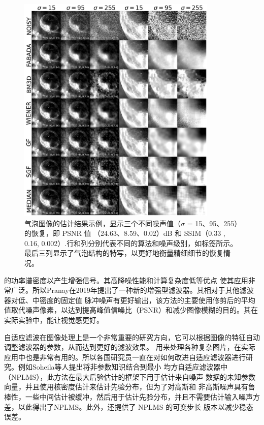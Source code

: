 \begin{figure}[htbp]
	\begin{center}
		\includegraphics[width = 0.85\textwidth]{images/02.eps}
		\caption{气泡图像的估计结果示例，显示三个不同噪声值（$\sigma$ = 15、95、255）的恢复，即 PSNR 值
        （24.63、8.59、0.02）dB 和 SSIM（0.33 , 0.16, 0.002）.行和列分别代表不同的算法和噪声级别，如标签所示。最后三列显示了气泡结构的特写，以更好地衡量精细细节的恢复情况。} 
		\label{02} %
	\end{center}
\end{figure}

的功率谱密度以产生增强信号。其高降噪性能和计算复杂度低等优点
使其应用非常广泛。所以Pranay在2019年提出了一种新的增强型滤波器\cite{kumarImageDeNoisingSalt2019}。其相对于其他滤波器对低、中密度的固定值
脉冲噪声有更好输出，该方法的主要使用修剪后的平均值取代噪声像素，以达到提高峰值信噪比（PSNR）和减少图像模糊的目的。其在实际实验中，能让视觉感更好。

自适应滤波在图像处理上是一个非常重要的研究方向，它可以根据图像的特征自动调整滤波器的参数，从而达到更好的滤波效果。
用来处理各种复杂图片，在实际应用中也是非常有用的。所以各国研究员一直在对如何改进自适应滤波器进行研究。例如Soheila等人提出将非参数知识结合到最小
均方自适应滤波器中（NPLMS）\cite{ashkezari-toussiIncorporatingNonparametricKnowledge2019}，此方法在最大后验估计的框架下用于估计来自噪声
数据的未知参数向量，并且使用核密度估计来估计先验分布，但为了对高斯和
非高斯噪声具有鲁棒性，一些中间估计被缓冲，然后用于估计先验分布，并且不需要估计输入噪声方差，以此得出了NPLMS。此外，还提供了 NPLMS 的可变步长
版本以减少稳态误差。

